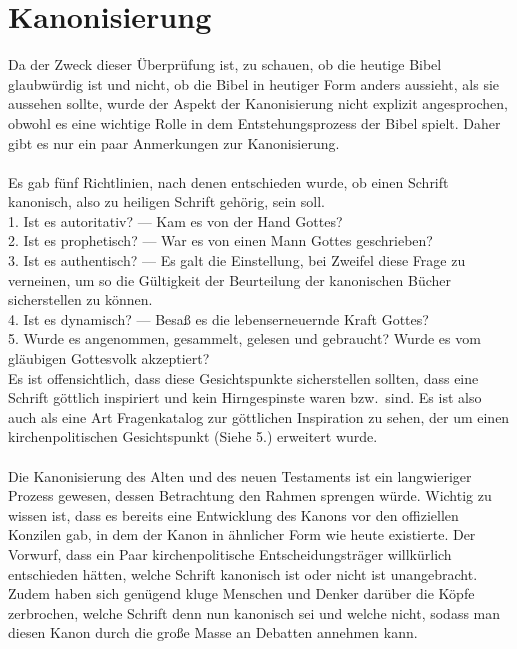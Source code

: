 \section{Kanonisierung}
Da der Zweck dieser Überprüfung ist, zu schauen, ob die heutige Bibel glaubwürdig ist und nicht, ob die Bibel in heutiger Form anders aussieht, als sie aussehen sollte, wurde der Aspekt der Kanonisierung nicht explizit angesprochen, obwohl es eine wichtige Rolle in dem Entstehungsprozess der Bibel spielt. Daher gibt es nur ein paar Anmerkungen zur Kanonisierung.
\\~\\
Es gab fünf Richtlinien, nach denen entschieden wurde, ob einen Schrift kanonisch, also zu heiligen Schrift gehörig, sein soll.
\\
1. Ist es autoritativ? --- Kam es von der Hand Gottes?
\\
2. Ist es prophetisch? --- War es von einen Mann Gottes geschrieben?
\\
3. Ist es authentisch? --- Es galt die Einstellung, bei Zweifel diese Frage zu verneinen, um so die Gültigkeit der Beurteilung der kanonischen Bücher sicherstellen zu können.
\\
4. Ist es dynamisch? --- Besaß es die lebenserneuernde Kraft Gottes?
\\
5. Wurde es angenommen, gesammelt, gelesen und gebraucht? Wurde es vom gläubigen Gottesvolk akzeptiert?
\\
Es ist offensichtlich, dass diese Gesichtspunkte sicherstellen sollten, dass eine Schrift göttlich inspiriert und kein Hirngespinste waren bzw.\ sind. Es ist also auch als eine Art Fragenkatalog zur göttlichen Inspiration zu sehen, der um einen kirchenpolitischen Gesichtspunkt (Siehe 5.) erweitert wurde.
\\~\\
Die Kanonisierung des Alten und des neuen Testaments ist ein langwieriger Prozess gewesen, dessen Betrachtung den Rahmen sprengen würde. Wichtig zu wissen ist, dass es bereits eine Entwicklung des Kanons vor den offiziellen Konzilen gab, in dem der Kanon in ähnlicher Form wie heute existierte. Der Vorwurf, dass ein Paar kirchenpolitische Entscheidungsträger willkürlich entschieden hätten, welche Schrift kanonisch ist oder nicht ist unangebracht.
Zudem haben sich genügend kluge Menschen und Denker darüber die Köpfe zerbrochen, welche Schrift denn nun kanonisch sei und welche nicht, sodass man diesen Kanon durch die große Masse an Debatten annehmen kann.